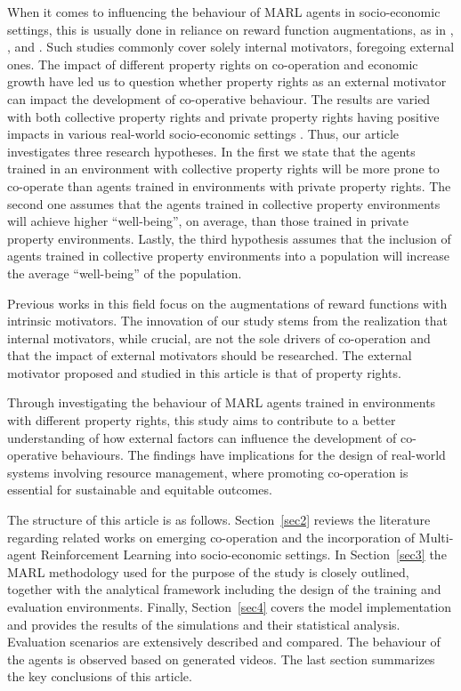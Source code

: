 \documentclass[pdflatex,sn-basic,lineno]{sn-jnl}
\theoremstyle{thmstyleone}%
\theoremstyle{thmstyletwo}%
\theoremstyle{thmstylethree}%
\begin{document}
When it comes to influencing the behaviour of MARL agents in socio-economic settings, this is usually done in reliance
on reward function augmentations, as in \cite{Willis2023a}, \cite{Peysakhovich2017}, and
\cite{Hughes2018}. Such studies commonly cover solely internal motivators, foregoing external ones. The impact of
different property rights on co-operation and economic growth have led us to question whether property rights as an
external motivator can impact the development of co-operative behaviour. The results are varied with both collective
property rights and private property rights having positive impacts in various real-world socio-economic settings
\citep{anderson2003property, Ostrom1990, Jaffe1996, Haydarolu2015, Baragwanath2023, montero2022cooperative}. Thus, our
article investigates three research hypotheses. In the first we state that the agents trained in an environment with
collective property rights will be more prone to co-operate than agents trained in environments with private property
rights. The second one assumes that the agents trained in collective property environments will achieve higher
“well-being”, on average, than those trained in private property environments. Lastly, the third hypothesis assumes that
the inclusion of agents trained in collective property environments into a population will increase the average
“well-being” of the population.

Previous works in this field focus on the augmentations of reward functions with intrinsic motivators. The innovation of
our study stems from the realization that internal motivators, while crucial, are not the sole drivers of co-operation
and that the impact of external motivators should be researched. The external motivator proposed and studied in this
article is that of property rights.

Through investigating the behaviour of MARL agents trained in environments with different property rights, this study
aims to contribute to a better understanding of how external factors can influence the development of co-operative
behaviours. The findings have implications for the design of real-world systems involving resource management, where
promoting co-operation is essential for sustainable and equitable outcomes.

The structure of this article is as follows. Section~\ref{sec2} reviews the literature regarding related works on
emerging co-operation and the incorporation of Multi-agent Reinforcement Learning into socio-economic settings. In
Section~\ref{sec3} the MARL methodology used for the purpose of the study is closely outlined, together with the
analytical framework including the design of the training and evaluation environments. Finally, Section~\ref{sec4}
covers the model implementation and provides the results of the simulations and their statistical analysis. Evaluation
scenarios are extensively described and compared. The behaviour of the agents is observed based on generated videos. The
last section summarizes the key conclusions of this article.
\end{document}
